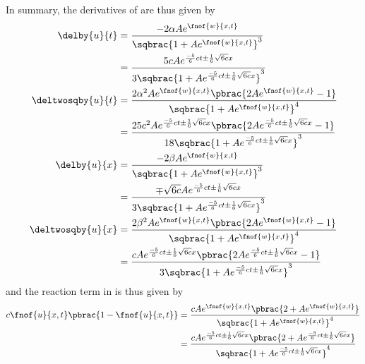 In summary, the derivatives of
 are thus given
by
\begin{equation}
  \begin{aligned}
    \delby{u}{t}&=\dfrac{-2\alpha A e^{\fnof{w}{x,t}}}{\sqbrac{1+A e^{\fnof{w}{x,t}}}^{3}}\\
    &=\dfrac{5 c A e^{\frac{-5}{6}ct\pm\frac{1}{6}\sqrt{6c}x}}{3\sqbrac{1+A e^{\frac{-5}{6}ct\pm\frac{1}{6}\sqrt{6c}x}}^{3}}\\
    \deltwosqby{u}{t}&=\dfrac{2\alpha^{2}A e^{\fnof{w}{x,t}}\pbrac{2A e^{\fnof{w}{x,t}}-1}}{\sqbrac{1+A e^{\fnof{w}{x,t}}}^{4}}\\
    &=\dfrac{25 c^{2} A e^{\frac{-5}{6}ct\pm\frac{1}{6}\sqrt{6c}x}\pbrac{2A e^{\frac{-5}{6}ct\pm\frac{1}{6}\sqrt{6c}x}-1}}{18\sqbrac{1+
        A e^{\frac{-5}{6}ct\pm\frac{1}{6}\sqrt{6c}x}}^{3}}\\
    \delby{u}{x}&=\dfrac{-2\beta A e^{\fnof{w}{x,t}}}{\sqbrac{1+A e^{\fnof{w}{x,t}}}^{3}}\\
    &=\dfrac{\mp\sqrt{6c} A e^{\frac{-5}{6}ct\pm\frac{1}{6}\sqrt{6c}x}}{3\sqbrac{1+A e^{\frac{-5}{6}ct\pm\frac{1}{6}\sqrt{6c}x}}^{3}}\\
    \deltwosqby{u}{x}&=\dfrac{2\beta^{2}A e^{\fnof{w}{x,t}}\pbrac{2A e^{\fnof{w}{x,t}}-1}}{\sqbrac{1+A e^{\fnof{w}{x,t}}}^{4}}\\
    &=\dfrac{c A e^{\frac{-5}{6}ct\pm\frac{1}{6}\sqrt{6c}x}\pbrac{2A e^{\frac{-5}{6}ct\pm\frac{1}{6}\sqrt{6c}x}-1}}{3\sqbrac{1+
        A e^{\frac{-5}{6}ct\pm\frac{1}{6}\sqrt{6c}x}}^{3}}
  \end{aligned}
  \label{eqn:AnalyticReactionDiffusionOneDim1Derivatives}
\end{equation}
and the reaction term in  is thus
given by
\begin{equation}
  \begin{aligned}
    c\fnof{u}{x,t}\pbrac{1-\fnof{u}{x,t}}&=\dfrac{cA e^{\fnof{w}{x,t}}\pbrac{2+A e^{\fnof{w}{x,t}}}}{\sqbrac{1+A e^{\fnof{w}{x,t}}}^{4}}\\
    &=\dfrac{cA e^{\frac{-5}{6}ct\pm\frac{1}{6}\sqrt{6c}x}\pbrac{2+A e^{\frac{-5}{6}ct\pm\frac{1}{6}\sqrt{6c}x}}}{\sqbrac{1+
        A e^{\frac{-5}{6}ct\pm\frac{1}{6}\sqrt{6c}x}}^{4}}
  \end{aligned}
  \label{eqn:AnalyticReactionDiffusionOneDim1Reaction}
\end{equation}

